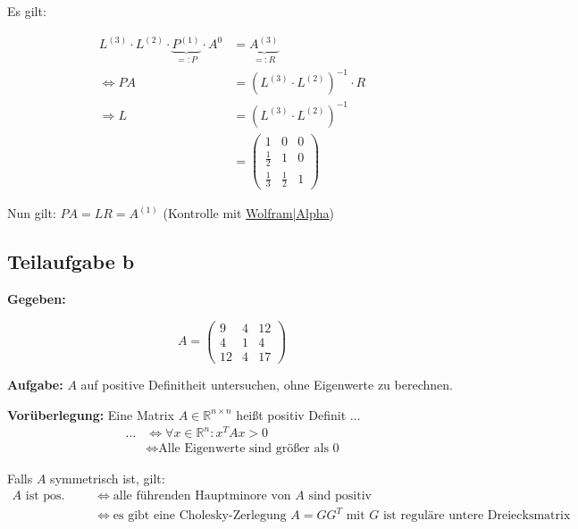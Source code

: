Es gilt:

\begin{align}
	L^{(3)} \cdot L^{(2)} \cdot \underbrace{P^{(1)}}_{=: P} \cdot A^{0} &= \underbrace{A^{(3)}}_{=: R}\\
	\Leftrightarrow P A &= (L^{(3)} \cdot L^{(2)})^{-1} \cdot R \\
	\Rightarrow L &= (L^{(3)} \cdot L^{(2)})^{-1}\\
	&= \begin{pmatrix}
		1 & 0 & 0\\
		\frac{1}{2} & 1 & 0\\
		\frac{1}{3} & \frac{1}{2} & 1
	\end{pmatrix}
\end{align}

Nun gilt: $P A = L R = A^{(1)}$ (Kontrolle mit \href{http://www.wolframalpha.com/input/?i=%7B%7B1%2C0%2C0%7D%2C%7B0.5%2C1%2C0%7D%2C%7B1%2F3%2C0.5%2C1%7D%7D*%7B%7B6%2C6%2C6%7D%2C%7B0%2C12%2C10%7D%2C%7B0%2C0%2C12%7D%7D}{Wolfram|Alpha})

\subsection*{Teilaufgabe b}

\textbf{Gegeben:}

\[A = 
\begin{pmatrix}
    9 & 4 & 12 \\
    4 & 1  & 4 \\
   12 & 4  & 17
\end{pmatrix}\]

\textbf{Aufgabe:} $A$ auf positive Definitheit untersuchen, ohne Eigenwerte zu berechnen.

\textbf{Vorüberlegung:}
Eine Matrix $A \in \mathbb{R}^{n \times n}$ heißt positiv Definit $\dots$
\begin{align*}
  \dots & \Leftrightarrow \forall x \in \mathbb{R}^n: x^T A x > 0\\
	& \Leftrightarrow \text{Alle Eigenwerte sind größer als 0}
\end{align*}

Falls $A$ symmetrisch ist, gilt:
\begin{align*}
 \text{$A$ ist pos. Definit} & \Leftrightarrow \text{alle führenden Hauptminore von $A$ sind positiv}\\
	& \Leftrightarrow \text{es gibt eine Cholesky-Zerlegung $A=GG^T$ mit $G$ ist reguläre untere Dreiecksmatrix}\\
\end{align*}

